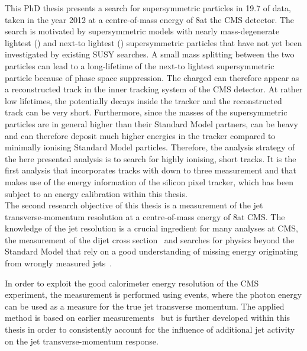 This PhD thesis presents a search for supersymmetric particles in 19.7 \fbinv of data, taken in the year 2012 at a centre-of-mass energy of 8\tev at the CMS detector. 
The search is motivated by supersymmetric models with nearly mass-degenerate lightest (\chiO) and next-to lightest (\chipm) supersymmetric particles that have not yet been investigated by existing SUSY searches.       
A small mass splitting between the two particles can lead to a long-lifetime of the next-to lightest supersymmetric particle \chipm because of phase space suppression.
The charged \chipm can therefore appear as a reconstructed track in the inner tracking system of the CMS detector.
At rather low \chipm lifetimes, the \chipm potentially decays inside the tracker and the reconstructed track can be very short.  
Furthermore, since the masses of the supersymmetric particles are in general higher than their Standard Model partners, \chipm can be heavy and can therefore deposit much higher energies in the tracker compared to minimally ionising Standard Model particles.
Therefore, the analysis strategy of the here presented analysis is to search for highly ionising, short tracks.
It is the first analysis that incorporates tracks with down to three measurement and that makes use of the energy information of the silicon pixel tracker, which has been subject to an energy calibration within this thesis.\\

The second research objective of this thesis is a measurement of the jet transverse-momentum resolution at a centre-of-mass energy of 8\tev at CMS.
The knowledge of the jet \pt resolution is a crucial ingredient for many analyses at CMS, \eg the measurement of the dijet cross section~\cite{bib:CMS:QCD_measurements} and searches for physics beyond the Standard Model that rely on a good understanding of missing energy originating from wrongly measured jets~\cite{bib:CMS:RA2_8TeV}.

In order to exploit the good calorimeter energy resolution of the CMS experiment, the measurement is performed using \GAMJET events, where the photon energy can be used as a measure for the true jet transverse momentum.
The applied method is based on earlier measurements~\cite{bib:CMS:JERCPaper_2011,CMS:PAS:JETResolution_7TeV} but is further developed within this thesis in order to consistently account for the influence of additional jet activity on the jet transverse-momentum response.\\

